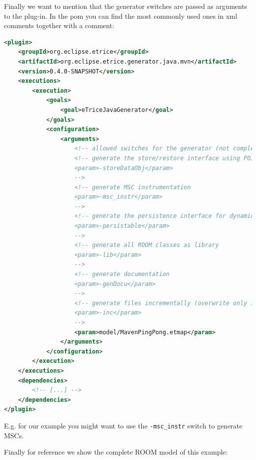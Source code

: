 Finally we want to mention that the generator switches are passed as arguments to the plug-in.
In the pom you can find the most commonly used ones in xml comments together with a comment:

\begin{lstlisting}[language=XML]
<plugin>
	<groupId>org.eclipse.etrice</groupId>
	<artifactId>org.eclipse.etrice.generator.java.mvn</artifactId>
	<version>0.4.0-SNAPSHOT</version>
	<executions>
		<execution>
			<goals>
				<goal>eTriceJavaGenerator</goal>
			</goals>
			<configuration>
				<arguments>
					<!-- allowed switches for the generator (not complete) -->
					<!-- generate the store/restore interface using POJO data objects
					<param>-storeDataObj</param>
					-->
					<!-- generate MSC instrumentation
					<param>-msc_instr</param>
					-->
					<!-- generate the persistence interface for dynamic actors
					<param>-persistable</param>
					-->
					<!-- generate all ROOM classes as library
					<param>-lib</param>
					-->
					<!-- generate documentation
					<param>-genDocu</param>
					-->
					<!-- generate files incrementally (overwrite only if contents changed)
					<param>-inc</param>
					-->
					<param>model/MavenPingPong.etmap</param>
				</arguments>
			</configuration>
		</execution>
	</executions>
	<dependencies>
		<!-- [...] -->
	</dependencies>
</plugin>
\end{lstlisting}

E.g. for our example you might want to use the \texttt{-msc\_instr} switch to generate MSCs.

Finally for reference we show the complete ROOM model of this example:


